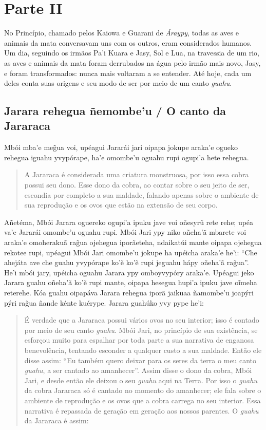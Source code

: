 \part{Parte II}


No Princípio, chamado pelos Kaiowa e Guarani de \emph{Áraypy}, todas as
aves e animais da mata conversavam uns com os outros, eram considerados
humanos. Um dia, seguindo os irmãos Pa'i Kuara e Jasy, Sol e Lua, na
travessia de um rio, as aves e animais da mata foram derrubados na água
pelo irmão mais novo, Jasy, e foram transformados: nunca mais voltaram a
se entender. Até hoje, cada um deles conta suas origens e seu modo de
ser por meio de um canto \emph{guahu}.

\chapter{Jarara rehegua ñemombe'u / O canto da Jararaca}

Mbói mba'e meg̃ua voi, upéagui Jararái jari oipapa jokupe araka'e ogueko
rehegua iguahu yvypórape, ha'e omombe'u oguahu rupi ogupi'a hete
rehegua.

\begin{quote}
A Jararaca é considerada uma criatura monstruosa, por isso essa cobra
possui seu dono. Esse dono da cobra, ao contar sobre o seu jeito de ser,
escondia por completo a sua maldade, falando apenas sobre o ambiente de
sua reprodução e os ovos que estão na extensão de seu corpo.
\end{quote}

Añetéma, Mbói Jarara oguereko ogupi'a ipuku jave voi oñesyrũ rete rehe;
upéa va'e Jararái omombe'u oguahu rupi. Mbói Jari ypy niko oñeha'ã
mbarete voi araka'e omoherakuã rag̃ua ojehegua iporãeteha, ndaikatúi
mante oipapa ojehegua rekotee rupi, upéagui Mbói Jari omombe'u jokupe ha
upéicha araka'e he'i: ``Che ahejáta ave che guahu yvypórape ko'ẽ ko'ẽ
rupi jeguahu hápy oñeha'ã rag̃ua''. He'i mbói jary, upéicha oguahu Jarara
ypy omboyvypóry araka'e. Upéagui jeko Jarara guahu oñeha'ã ko'ẽ rupi
mante, oipapa hesegua hupi'a ipuku jave oĩmeha reterehe. Kóa guahu
oipapáva Jarara rehegua iporã jaikuaa ñamombe'u joapýri pýri rag̃ua ñande
kénte kuérype. Jarara guahúko yvy pype he'i:

\begin{quote}
É verdade que a Jararaca possui vários ovos no seu interior; isso é
contado por meio de seu canto \emph{guahu}. Mbói Jari, no princípio de
sua existência, se esforçou muito para espalhar por toda parte a sua
narrativa de enganosa benevolência, tentando esconder a qualquer custo a
sua maldade. Então ele disse assim: ``Eu também quero deixar para os
seres da terra o meu canto \emph{guahu}, a ser cantado ao amanhecer''.
Assim disse o dono da cobra, Mbói Jari, e desde então ele deixou o seu
\emph{guahu} aqui na Terra. Por isso o \emph{guahu} da cobra Jararaca só
é cantado no momento do amanhecer; ele fala sobre o ambiente de
reprodução e os ovos que a cobra carrega no seu interior. Essa narrativa
é repassada de geração em geração aos nossos parentes. O \emph{guahu} da
Jararaca é assim:
\end{quote}

